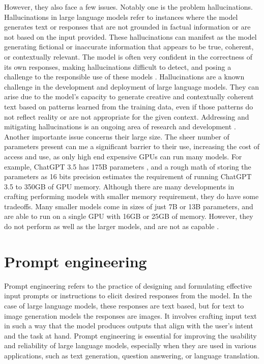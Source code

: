 However, they also face a few issues. Notably one is the problem hallucinations. Hallucinations in large language models refer to instances where the model generates text or responses that are not grounded in factual information or are not based on the input provided. These hallucinations can manifest as the model generating fictional or inaccurate information that appears to be true, coherent, or contextually relevant. The model is often very confident in the correctness of its own responses, making hallucinations difficult to detect, and posing a challenge to the responsible use of these models \cite{alkaissi2023artificial,azamfirei2023large}. Hallucinations are a known challenge in the development and deployment of large language models. They can arise due to the model's capacity to generate creative and contextually coherent text based on patterns learned from the training data, even if those patterns do not reflect reality or are not appropriate for the given context. Addressing and mitigating hallucinations is an ongoing area of research and development \cite{gunjal2023detecting,mundler2023self,peng2023check}. Another importante issue concerns their large size. The sheer number of parameters present can me a significant barrier to their use, increasing the cost of access and use, as only high end expensive GPUs can run many models. For example, ChatGPT 3.5 has 175B parameters \cite{chatgpt-parameters}, and a rough math of storing the parameters as 16 bits precision estimates the requirement of running ChatGPT 3.5 to 350GB of GPU memory. Although there are many developments in crafting performing models with smaller memory requirement, they do have some tradeoffs. Many smaller models come in sizes of just 7B or 13B parameters, and are able to run on a single GPU with 16GB or 25GB of memory. However, they do not perform as well as the larger models, and are not as capable \cite{touvronllama,falcon40b,mpt7b,wizard-vicuna}. 

\section{Prompt engineering}

Prompt engineering refers to the practice of designing and formulating effective input prompts or instructions to elicit desired responses from the model. In the case of large language models, these responses are text based, but for text to image generation models the responses are images. It involves crafting input text in such a way that the model produces outputs that align with the user's intent and the task at hand. Prompt engineering is essential for improving the usability and reliability of large language models, especially when they are used in various applications, such as text generation, question answering, or language translation. \cite{white2023prompt,zhou2022learning,oppenlaender2022prompt,reynolds2021prompt}

